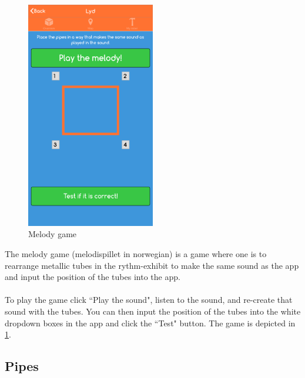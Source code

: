 \begin{figure}[H]
    \centering
    \includegraphics[width=0.5\textwidth]{images/app/Lyd.png}
    \caption{Melody game}
    \label{fig:Lyd}
\end{figure}

The melody game (melodispillet in norwegian) is a game where one is to rearrange metallic tubes in the rythm-exhibit to make the same sound as the app and input the position of the tubes into the app.\\\\
To play the game click ``Play the sound", listen to the sound, and re-create that sound with the tubes. You can then input the position of the tubes into the white dropdown boxes in the app and click the ``Test" button. The game is depicted in \ref{fig:Lyd}.


\subsection{Pipes}

